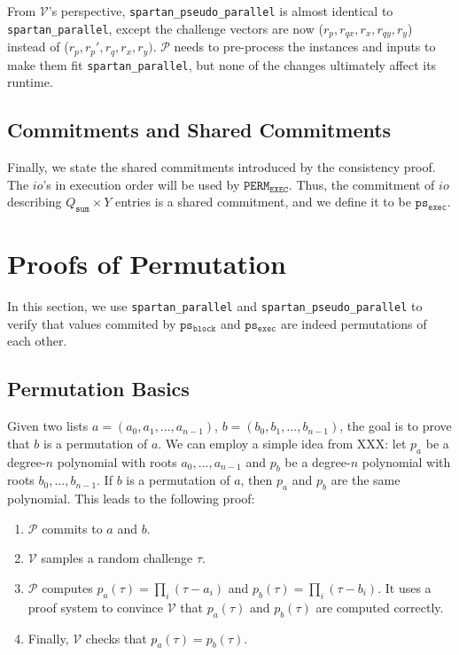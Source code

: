 \documentclass{article}
\newcommand{\red}[1] {\color{red}#1\color{black}}
\newcommand{\code}{\texttt}
\newcommand{\Qsum}{Q_{\mathtt{sum}}}
\renewcommand{\P}{\mathcal{P}}
\newcommand{\V}{\mathcal{V}}
\newcommand{\PERME}{\mathtt{PERM_{EXEC}}}
\newcommand{\psb}{\mathtt{ps_{block}}}
\newcommand{\pse}{\mathtt{ps_{exec}}}
\begin{document}
From $\V$'s perspective, \code{spartan\_pseudo\_parallel} is almost identical to \code{spartan\_parallel}, except the challenge vectors are now ($r_p, r_{qx}, r_x, r_{qy}, r_y$) instead of ($r_p, r_p', r_q, r_x, r_y)$. $\P$ needs to pre-process the instances and inputs to make them fit \code{spartan\_parallel}, but none of the changes ultimately affect its runtime.

\subsection{Commitments and Shared Commitments}

Finally, we state the shared commitments introduced by the consistency proof. The $io$'s in execution order will be used by $\PERME$. Thus, the commitment of $io$ describing $\Qsum \times Y$ entries is a shared commitment, and we define it to be $\pse$.


\section{Proofs of Permutation}\label{sec:permutation}

In this section, we use \code{spartan\_parallel} and \code{spartan\_pseudo\_parallel} to verify that values commited by $\psb$ and $\pse$ are indeed permutations of each other. 

\subsection{Permutation Basics}

Given two lists $a = (a_0, a_1, ..., a_{n-1})$, $b = (b_0, b_1, ..., b_{n-1})$, the goal is to prove that $b$ is a permutation of $a$. We can employ a simple idea from \red{XXX}: let $p_a$ be a degree-$n$ polynomial with roots $a_0, ..., a_{n-1}$ and $p_b$ be a degree-$n$ polynomial with roots $b_0, ..., b_{n-1}$. If $b$ is a permutation of $a$, then $p_a$ and $p_b$ are the same polynomial. This leads to the following proof:
\begin{enumerate}
    \item $\P$ commits to $a$ and $b$.
    \item $\V$ samples a random challenge $\tau$.
    \item $\P$ computes $p_a(\tau) = \prod_i (\tau - a_i)$ and $p_b(\tau) = \prod_i (\tau - b_i)$. It uses a proof system to convince $\V$ that $p_a(\tau)$ and $p_b(\tau)$ are computed correctly.
    \item Finally, $\V$ checks that $p_a(\tau) = p_b(\tau)$.
\end{enumerate} 
\end{document}
